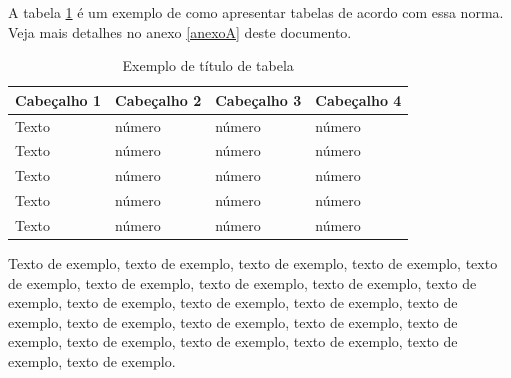 \documentclass[
	12pt,				%
	oneside,			%
	a4paper,			%
	english,			%
	brazil				%
	]{abntex2ppgsi}
\begin{document}
A tabela \ref{tab:ExemploDeTabela1} é um exemplo de como apresentar tabelas de acordo com essa norma. Veja mais detalhes no anexo \ref{anexoA} deste documento.

% 
%
%
%
%
\begin{table}[htbp]
	\centering
	\caption{Exemplo de título de tabela}
		\begin{tabular}{p{1in} p{1in} p{1in} p{1in} } \hline

		Cabeçalho 1	& Cabeçalho 2	& Cabeçalho 3	& Cabeçalho 4 \\ \hline
		Texto	& número & número	& número \\ 
		Texto	& número & número	& número \\ 
		Texto	& número & número	& número \\ 
		Texto	& número & número	& número \\ 
		Texto	& número & número	& número \\ \hline
		
		\end{tabular}
	\label{tab:ExemploDeTabela1}
\end{table}

Texto de exemplo, texto de exemplo, texto de exemplo, texto de exemplo, texto de exemplo, texto de exemplo, texto de exemplo, texto de exemplo, texto de exemplo, texto de exemplo, texto de exemplo, texto de exemplo, texto de exemplo, texto de exemplo, texto de exemplo, texto de exemplo, texto de exemplo, texto de exemplo, texto de exemplo, texto de exemplo, texto de exemplo, texto de exemplo.
\end{document}
